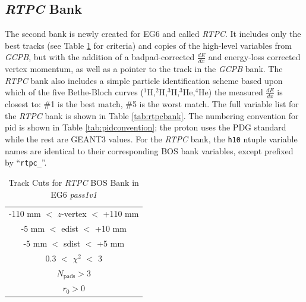 \documentclass[amsmath,amssymb,notitlepage,12pt]{revtex4-1}
\begin{document}
\subsection{{\it RTPC} Bank}\label{sec:rtpcbank}
The second bank is newly created for EG6 and called {\it RTPC}.  It includes only the best tracks (see Table \ref{tab:rtpccuts} for criteria) and copies of the high-level variables from {\it GCPB}, but with the addition of a badpad-corrected $\frac{dE}{dx}$ and energy-loss corrected vertex momentum, as well as a pointer to the track in the {\it GCPB} bank.  The {\it RTPC} bank also includes a simple particle identification scheme based upon which of the five Bethe-Bloch curves ($^1$H,$^2$H,$^3$H,$^3$He,$^4$He) the measured $\frac{dE}{dx}$ is closest to:  \#1 is the best match, \#5 is the worst match.  The full variable list for the {\it RTPC} bank is shown in Table \ref{tab:rtpcbank}.  The numbering convention for pid is shown in Table \ref{tab:pidconvention}; the proton uses the PDG standard while the rest are GEANT3 values.  For the {\it RTPC} bank, the \texttt{h10} ntuple variable names are identical to their corresponding BOS bank variables, except prefixed by ``\texttt{rtpc\_}''.
\begin{table}[thpb]
    \caption{\label{tab:rtpccuts}Track Cuts for {\it RTPC} BOS Bank in EG6 {\it pass1v1}}
    \begin{tabular}{c}
    \toprule[1.5pt]
    -110 mm $<$ $z$-vertex $<$ +110 mm \\
    -5 mm $<$ edist $<$ +10 mm \\
    -5 mm  $<$ sdist $<$ +5 mm \\
    0.3   $<$ $\chi^2$ $<$  3 \\
    $N_{\textrm{pads}} > 3 $\\
    $r_0>0$ \\
    \bottomrule[1.5pt]
\end{tabular}
\end{table}
\end{document}
